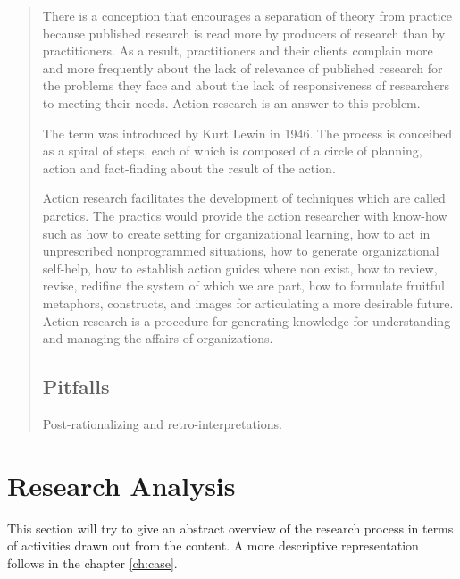 \begin{quotation}
There is a conception that encourages a separation of theory from practice because published research is read more by producers of research than by practitioners. As a result, practitioners and their clients complain more and more frequently about the lack of relevance of published research for the problems they face and about the lack of responsiveness of researchers to meeting their needs.
Action research is an answer to this problem. 


The term was introduced by Kurt Lewin in 1946. The process is conceibed as a spiral of steps, each of which is composed of a circle of planning, action and fact-finding about the result of the action.

Action research facilitates the development of techniques which are called parctics. 
The practics would provide the action researcher with know-how such as how to create setting for organizational learning, how to act in unprescribed nonprogrammed situations, how to generate organizational self-help, how to establish action guides where non exist, how to review, revise, redifine the system of which we are part, how to formulate fruitful metaphors, constructs, and images for articulating a more desirable future. 
Action research is a procedure for generating knowledge for understanding and managing the affairs of organizations.
\subsection{Pitfalls}
Post-rationalizing and retro-interpretations.
\\
\end{quotation}
\cite{car:rmn}
\cite{bjo:risc}
\cite{assess:susman}

\section{Research Analysis}
This section will try to give an abstract overview of the research process in terms of activities drawn out from the content. 
A more descriptive representation follows in the chapter \ref{ch:case}.  
